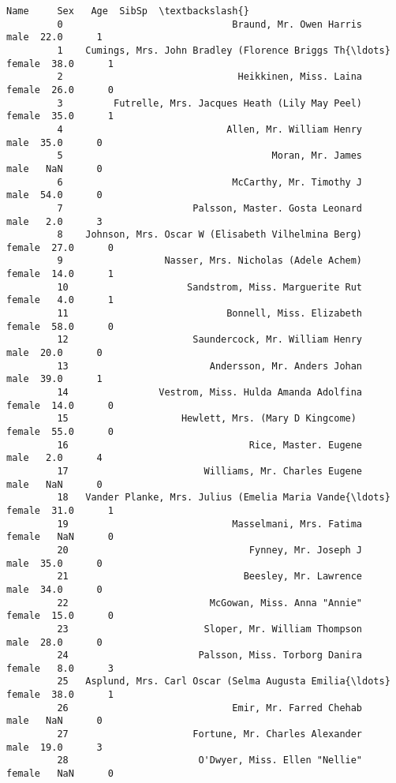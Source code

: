 \documentclass[11pt]{article}
\begin{document}
\begin{Verbatim}[commandchars=\\\{\}]
                                                           Name     Sex   Age  SibSp  \textbackslash{}
         0                              Braund, Mr. Owen Harris    male  22.0      1   
         1    Cumings, Mrs. John Bradley (Florence Briggs Th{\ldots}  female  38.0      1   
         2                               Heikkinen, Miss. Laina  female  26.0      0   
         3         Futrelle, Mrs. Jacques Heath (Lily May Peel)  female  35.0      1   
         4                             Allen, Mr. William Henry    male  35.0      0   
         5                                     Moran, Mr. James    male   NaN      0   
         6                              McCarthy, Mr. Timothy J    male  54.0      0   
         7                       Palsson, Master. Gosta Leonard    male   2.0      3   
         8    Johnson, Mrs. Oscar W (Elisabeth Vilhelmina Berg)  female  27.0      0   
         9                  Nasser, Mrs. Nicholas (Adele Achem)  female  14.0      1   
         10                     Sandstrom, Miss. Marguerite Rut  female   4.0      1   
         11                            Bonnell, Miss. Elizabeth  female  58.0      0   
         12                      Saundercock, Mr. William Henry    male  20.0      0   
         13                         Andersson, Mr. Anders Johan    male  39.0      1   
         14                Vestrom, Miss. Hulda Amanda Adolfina  female  14.0      0   
         15                    Hewlett, Mrs. (Mary D Kingcome)   female  55.0      0   
         16                                Rice, Master. Eugene    male   2.0      4   
         17                        Williams, Mr. Charles Eugene    male   NaN      0   
         18   Vander Planke, Mrs. Julius (Emelia Maria Vande{\ldots}  female  31.0      1   
         19                             Masselmani, Mrs. Fatima  female   NaN      0   
         20                                Fynney, Mr. Joseph J    male  35.0      0   
         21                               Beesley, Mr. Lawrence    male  34.0      0   
         22                         McGowan, Miss. Anna "Annie"  female  15.0      0   
         23                        Sloper, Mr. William Thompson    male  28.0      0   
         24                       Palsson, Miss. Torborg Danira  female   8.0      3   
         25   Asplund, Mrs. Carl Oscar (Selma Augusta Emilia{\ldots}  female  38.0      1   
         26                             Emir, Mr. Farred Chehab    male   NaN      0   
         27                      Fortune, Mr. Charles Alexander    male  19.0      3   
         28                       O'Dwyer, Miss. Ellen "Nellie"  female   NaN      0   

\end{Verbatim}
\end{document}
